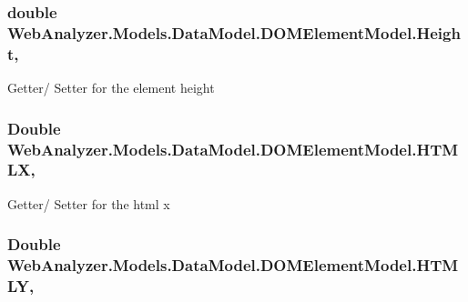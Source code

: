 \subsubsection[{Height}]{\setlength{\rightskip}{0pt plus 5cm}double Web\+Analyzer.\+Models.\+Data\+Model.\+D\+O\+M\+Element\+Model.\+Height\hspace{0.3cm}{\ttfamily [get]}, {\ttfamily [set]}}\label{class_web_analyzer_1_1_models_1_1_data_model_1_1_d_o_m_element_model_aa5965b140e814fe18f8b9551f1a66b73}


Getter/ Setter for the element height 

\hypertarget{class_web_analyzer_1_1_models_1_1_data_model_1_1_d_o_m_element_model_a7aee1f5b1f3f0eafd2cd368a4c7165cf}{}
\subsubsection[{H\+T\+M\+L\+X}]{\setlength{\rightskip}{0pt plus 5cm}Double Web\+Analyzer.\+Models.\+Data\+Model.\+D\+O\+M\+Element\+Model.\+H\+T\+M\+L\+X\hspace{0.3cm}{\ttfamily [get]}, {\ttfamily [set]}}\label{class_web_analyzer_1_1_models_1_1_data_model_1_1_d_o_m_element_model_a7aee1f5b1f3f0eafd2cd368a4c7165cf}


Getter/ Setter for the html x 

\hypertarget{class_web_analyzer_1_1_models_1_1_data_model_1_1_d_o_m_element_model_a179b7d7715dba28ac6c999208df994d8}{}
\subsubsection[{H\+T\+M\+L\+Y}]{\setlength{\rightskip}{0pt plus 5cm}Double Web\+Analyzer.\+Models.\+Data\+Model.\+D\+O\+M\+Element\+Model.\+H\+T\+M\+L\+Y\hspace{0.3cm}{\ttfamily [get]}, {\ttfamily [set]}}\label{class_web_analyzer_1_1_models_1_1_data_model_1_1_d_o_m_element_model_a179b7d7715dba28ac6c999208df994d8}


